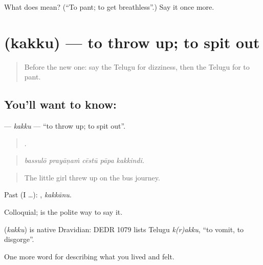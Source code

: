 \begin{tcolorbox}[breakable,colback=teal!4,colframe=teal!35!black,title={Before you move on}]
What does  mean? (\textquotedblleft{}To pant; to get breathless\textquotedblright{}.) Say it once more.
\end{tcolorbox}
\section[\texorpdfstring{\te{కక్కు} (kakku)}{కక్కు (kakku)}]{ (kakku) — to throw up; to spit out}

\label{lesson:TE-C517-kakku}



\begin{quote}
Before the new one: say the Telugu for dizziness, then the Telugu for to pant.
\end{quote}

\subsection*{You'll want to know: }
\textbf{} — \emph{kakku} — \textquotedblleft{}to throw up; to spit out\textquotedblright{}.

\begin{quote}
    .
\end{quote}

\begin{quote}
\emph{bassulō prayāṇaṁ cēstū pāpa kakkindi.}
\end{quote}

\begin{quote}
The little girl threw up on the bus journey.
\end{quote}

Past (I …): , \emph{kakkānu}.

Colloquial;   is the polite way to say it.

\begin{cousinweb}
\textbf{} (\emph{kakku}) is native Dravidian: DEDR 1079 lists Telugu \emph{k(r)akku}, \textquotedblleft{}to vomit, to disgorge\textquotedblright{}.
\end{cousinweb}

\begin{grammarlens}[title={What you've built}]
One more word for describing what you lived and felt.
\end{grammarlens}


